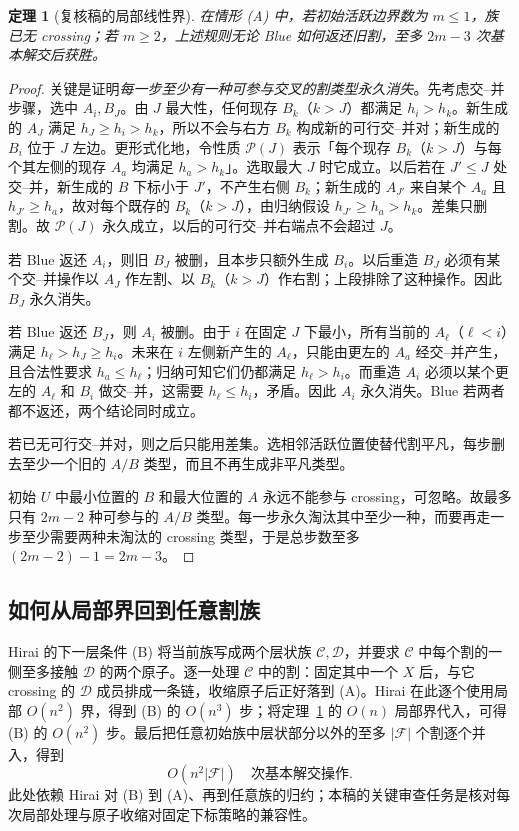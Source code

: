 \documentclass[UTF8,11pt,a4paper]{ctexart}
\newtheorem{theorem}[definition]{定理}
\newcommand{\calF}{\mathcal F}
\begin{document}
\begin{theorem}[复核稿的局部线性界]\label{thm:local}
在情形 (A) 中，若初始活跃边界数为 $m\le1$，族已无 crossing；若 $m\ge2$，上述规则无论 Blue 如何返还旧割，至多 $2m-3$ 次基本解交后获胜。
\end{theorem}

\begin{proof}
关键是证明\emph{每一步至少有一种可参与交叉的割类型永久消失}。先考虑交--并步骤，选中 $A_i,B_J$。由 $J$ 最大性，任何现存 $B_k$（$k>J$）都满足 $h_i>h_k$。新生成的 $A_J$ 满足 $h_J\ge h_i>h_k$，所以不会与右方 $B_k$ 构成新的可行交--并对；新生成的 $B_i$ 位于 $J$ 左边。更形式化地，令性质 $\mathcal P(J)$ 表示「每个现存 $B_k$（$k>J$）与每个其左侧的现存 $A_a$ 均满足 $h_a>h_k$」。选取最大 $J$ 时它成立。以后若在 $J'\le J$ 处交--并，新生成的 $B$ 下标小于 $J'$，不产生右侧 $B_k$；新生成的 $A_{J'}$ 来自某个 $A_a$ 且 $h_{J'}\ge h_a$，故对每个既存的 $B_k$（$k>J$），由归纳假设 $h_{J'}\ge h_a>h_k$。差集只删割。故 $\mathcal P(J)$ 永久成立，以后的可行交--并右端点不会超过 $J$。

若 Blue 返还 $A_i$，则旧 $B_J$ 被删，且本步只额外生成 $B_i$。以后重造 $B_J$ 必须有某个交--并操作以 $A_J$ 作左割、以 $B_k$（$k>J$）作右割；上段排除了这种操作。因此 $B_J$ 永久消失。

若 Blue 返还 $B_J$，则 $A_i$ 被删。由于 $i$ 在固定 $J$ 下最小，所有当前的 $A_\ell$（$\ell<i$）满足 $h_\ell>h_J\ge h_i$。未来在 $i$ 左侧新产生的 $A_\ell$，只能由更左的 $A_a$ 经交--并产生，且合法性要求 $h_a\le h_\ell$；归纳可知它们仍都满足 $h_\ell>h_i$。而重造 $A_i$ 必须以某个更左的 $A_\ell$ 和 $B_i$ 做交--并，这需要 $h_\ell\le h_i$，矛盾。因此 $A_i$ 永久消失。Blue 若两者都不返还，两个结论同时成立。

若已无可行交--并对，则之后只能用差集。选相邻活跃位置使替代割平凡，每步删去至少一个旧的 $A/B$ 类型，而且不再生成非平凡类型。

初始 $U$ 中最小位置的 $B$ 和最大位置的 $A$ 永远不能参与 crossing，可忽略。故最多只有 $2m-2$ 种可参与的 $A/B$ 类型。每一步永久淘汰其中至少一种，而要再走一步至少需要两种未淘汰的 crossing 类型，于是总步数至多 $(2m-2)-1=2m-3$。
\end{proof}

\subsection{如何从局部界回到任意割族}

Hirai 的下一层条件 (B) 将当前族写成两个层状族 $\mathcal C,\mathcal D$，并要求 $\mathcal C$ 中每个割的一侧至多接触 $\mathcal D$ 的两个原子。逐一处理 $\mathcal C$ 中的割：固定其中一个 $X$ 后，与它 crossing 的 $\mathcal D$ 成员排成一条链，收缩原子后正好落到 (A)。Hirai 在此逐个使用局部 $O(n^2)$ 界，得到 (B) 的 $O(n^3)$ 步；将定理~\ref{thm:local} 的 $O(n)$ 局部界代入，可得 (B) 的 $O(n^2)$ 步。最后把任意初始族中层状部分以外的至多 $|\calF|$ 个割逐个并入，得到
\begin{equation}\label{eq:global-bound}
O(n^2|\calF|)\quad\text{次基本解交操作}.
\end{equation}
此处依赖 Hirai 对 (B) 到 (A)、再到任意族的归约；本稿的关键审查任务是核对每次局部处理与原子收缩对固定下标策略的兼容性。
\end{document}
